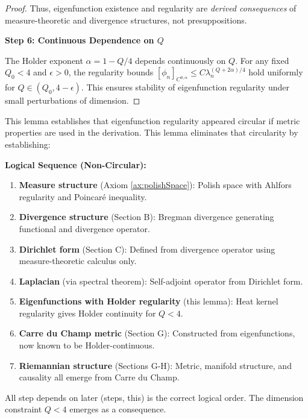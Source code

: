 \begin{proof}
Thus, eigenfunction existence and regularity are \textit{derived consequences} of measure-theoretic and divergence structures, not presuppositions.

\textbf{Step 6: Continuous Dependence on $Q$}

The Holder exponent $\alpha = 1 - Q/4$ depends continuously on $Q$. For any fixed $Q_0 < 4$ and $\epsilon > 0$, the regularity bounds $[\phi_n]_{C^{0,\alpha}} \leq C \lambda_n^{(Q+2\alpha)/4}$ hold uniformly for $Q \in (Q_0, 4-\epsilon)$. This ensures stability of eigenfunction regularity under small perturbations of dimension.

\end{proof}

\begin{remark}
\label{rem:logicalorderandcircularityresolution}

This lemma establishes that eigenfunction regularity appeared circular if metric properties are used in the derivation. This lemma eliminates that circularity by establishing:

\textbf{Logical Sequence (Non-Circular):}
\begin{enumerate}
\item \textbf{Measure structure} (Axiom \ref{ax:polishSpace}): Polish space with Ahlfors regularity and Poincaré inequality.
\item \textbf{Divergence structure} (Section B): Bregman divergence generating functional and divergence operator.
\item \textbf{Dirichlet form} (Section C): Defined from divergence operator using measure-theoretic calculus only.
\item \textbf{Laplacian} (via spectral theorem): Self-adjoint operator from Dirichlet form.
\item \textbf{Eigenfunctions with Holder regularity} (this lemma): Heat kernel regularity gives Holder continuity for $Q < 4$.
\item \textbf{Carre du Champ metric} (Section G): Constructed from eigenfunctions, now known to be Holder-continuous.
\item \textbf{Riemannian structure} (Sections G-H): Metric, manifold structure, and causality all emerge from Carre du Champ.
\end{enumerate}

All step depends on later (steps, this) is the correct logical order. The dimension constraint $Q < 4$ emerges as a consequence.

\end{remark}
